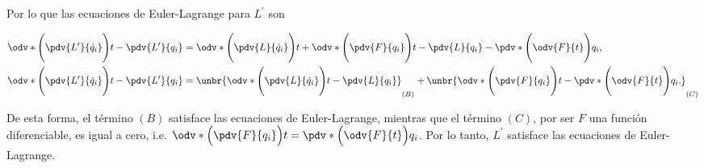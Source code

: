 \documentclass[../main.tex]{subfiles}
\begin{document}
\begin{problema}
	Por lo que las ecuaciones de Euler-Lagrange para \(L^{\prime}\) son

	\begin{align*}
		\odv*{\Biggl(\pdv{L^{\prime}}{\dot{q}_{i}}\Biggr)}{t} - \pdv{L^{\prime}}{q_{i}} & = \odv*{\Biggl(\pdv{L}{\dot{q}_{i}}\Biggr)}{t} + \odv*{\Biggl(\pdv{F}{q_{i}}\Biggr)}{t} - \pdv{L}{q_{i}} - \pdv*{\Biggl(\odv{F}{t}\Biggr)}{q_{i}},                           \\
		\odv*{\Biggl(\pdv{L^{\prime}}{\dot{q}_{i}}\Biggr)}{t} - \pdv{L^{\prime}}{q_{i}} & = \unbr{\odv*{\Biggl(\pdv{L}{\dot{q}_{i}}\Biggr)}{t} - \pdv{L}{q_{i}}}_{(B)} + \unbr{\odv*{\Biggl(\pdv{F}{q_{i}}\Biggr)}{t} - \pdv*{\Biggl(\odv{F}{t}\Biggr)}{q_{i}}.}_{(C)}
	\end{align*}

	De esta forma, el término \((B)\) satisface las ecuaciones de
	Euler-Lagrange, mientras que el término \((C)\), por ser \(F\) una función
	diferenciable, es igual a cero, i.e. \(\odv*{\Bigl(\pdv{F}{q_{i}}\Bigr)}{t} = \pdv*{\Bigl(\odv{F}{t}\Bigr)}{q_{i}}\). Por lo tanto, \( L^{\prime}\) satisface las
	ecuaciones de Euler-Lagrange.
\end{problema}
\end{document}
